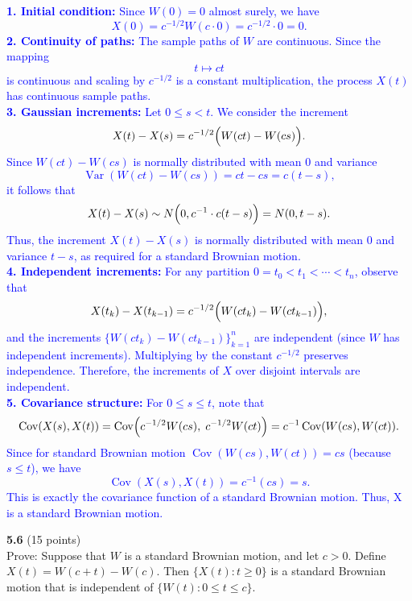 \documentclass{article}
\begin{document}
\textcolor{blue}{
    \noindent\textbf{1. Initial condition:} Since $W(0)=0$ almost surely, we have
\[
X(0) = c^{-1/2} W(c\cdot 0)= c^{-1/2}\cdot 0 = 0.
\]
\noindent \textbf{2. Continuity of paths:} The sample paths of $W$ are continuous. Since the mapping 
\[
t\mapsto ct
\]
is continuous and scaling by $c^{-1/2}$ is a constant multiplication, the process $X(t)$ has continuous sample paths. \\
\noindent \textbf{3. Gaussian increments:} Let $0\leq s < t$. We consider the increment
\[
X(t)-X(s)= c^{-1/2}\Bigl(W(ct)-W(cs)\Bigr).
\]
Since $W(ct)-W(cs)$ is normally distributed with mean $0$ and variance
\[
\operatorname{Var}(W(ct)-W(cs)) = ct-cs = c(t-s),
\]
it follows that
\[
X(t)-X(s) \sim N\Bigl(0, c^{-1} \cdot c(t-s)\Bigr) = N(0,t-s).
\]
Thus, the increment $X(t)-X(s)$ is normally distributed with mean $0$ and variance $t-s$, as required for a standard Brownian motion. \\
\noindent \textbf{4. Independent increments:} For any partition $0=t_0<t_1<\cdots<t_n$, observe that
\[
X(t_k)-X(t_{k-1}) = c^{-1/2}\Bigl(W(ct_k)-W(ct_{k-1})\Bigr),
\]
and the increments $\{W(ct_k)-W(ct_{k-1})\}_{k=1}^n$ are independent (since $W$ has independent increments). Multiplying by the constant $c^{-1/2}$ preserves independence. Therefore, the increments of $X$ over disjoint intervals are independent. \\
\noindent \textbf{5. Covariance structure:} For $0\le s\le t$, note that
\[
\operatorname{Cov}(X(s),X(t)) = \operatorname{Cov}\Bigl(c^{-1/2}W(cs), \; c^{-1/2}W(ct)\Bigr)
= c^{-1}\operatorname{Cov}(W(cs),W(ct)).
\]
Since for standard Brownian motion $\operatorname{Cov}(W(cs),W(ct)) = cs$ (because $s\le t$), we have
\[
\operatorname{Cov}(X(s),X(t)) = c^{-1}(cs)= s.
\]
This is exactly the covariance function of a standard Brownian motion. Thus, X is a standard Brownian motion.
}


\noindent
\textbf{5.6} (15 points) \\ Prove: Suppose that $W$ is a standard Brownian motion, and let $c > 0$. Define $X(t) = W(c + t) - W(c)$. Then $\{X(t) : t \ge 0\}$ is a standard Brownian motion that is independent of $\{W(t) : 0 \le t \le c\}$.
\end{document}
